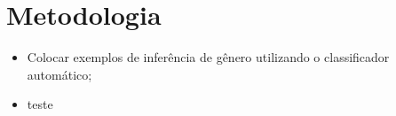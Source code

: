 \chapter{Metodologia}

\begin{itemize}
\item Colocar exemplos de inferência de gênero utilizando o classificador automático;
\item teste
\end{itemize}